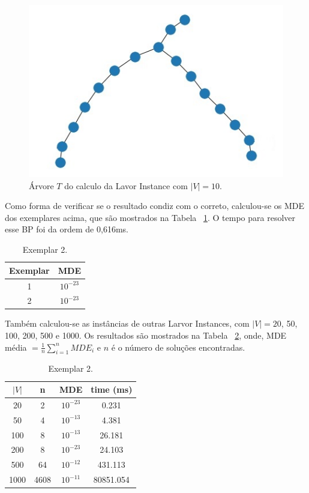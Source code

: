 \documentclass[a4paper,12pt]{article}
\begin{document}
	\begin{figure}[H]
		\begin{center}
			\includegraphics[width=0.45\linewidth]{lavor10.jpeg}
		\end{center}
		\caption{Árvore $T$ do calculo da Lavor Instance com $|V| = 10$.}
		\label{fig:arvore}
	\end{figure}
	
	Como forma de verificar se o resultado condiz com o correto, calculou-se os MDE dos exemplares acima, que são mostrados na Tabela ~\ref{tab:resul}. O tempo para resolver esse BP foi da ordem de 0,616ms.
	
	\begin{table}[H]
		\centering
		\begin{tabular}{ |c c| } 
			\hline
			\textbf{Exemplar} & \textbf{MDE} \\\hline
			1 & $10^{-23}$\\
			2 & $10^{-23}$\\\hline
		\end{tabular}
		\caption{Exemplar 2.}
		\label{tab:resul}
	\end{table}
	
	Também calculou-se as instâncias de outras Larvor Instances, com $|V| = 20$, 50, 100, 200, 500 e 1000. Os resultados são mostrados na Tabela ~\ref{tab:resul2}, onde, MDE média $= \frac{1}{n}\sum_{i=1}^{n}MDE_i$ e $n$ é o número de soluções encontradas.
	
	\begin{table}[H]
		\centering
		\begin{tabular}{ |c c c c| } 
			\hline
			\textbf{$|V|$} & n & \textbf{MDE} & \textbf{time (ms)} \\\hline
			20 & 2 & $10^{-23}$& 0.231 \\
			50 & 4 & $10^{-13}$& 4.381\\\hline
			100 & 8 & $10^{-13}$& 26.181 \\\hline
			200 & 8 & $10^{-23}$& 24.103\\\hline
			500 & 64 & $10^{-12}$& 431.113 \\\hline
			1000 & 4608 & $10^{-11}$& 80851.054 \\\hline
		\end{tabular}
		\caption{Exemplar 2.}
		\label{tab:resul2}
	\end{table}
	
\end{document}
